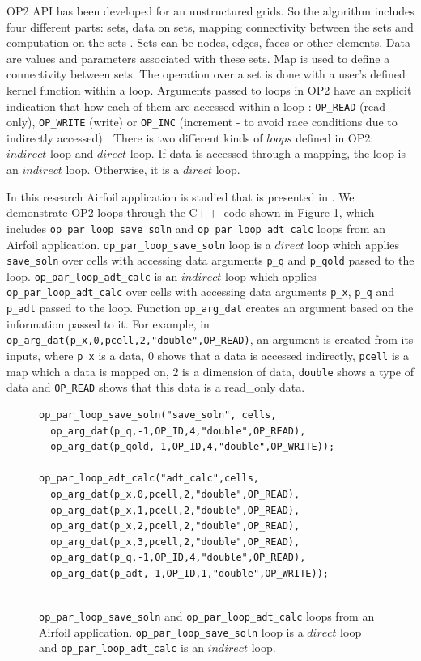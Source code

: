 \documentclass[conference]{IEEEtran}
\begin{document}
OP2 API has been developed for an unstructured grids. So the algorithm includes four different parts: sets, data on sets, mapping connectivity between the sets and computation on the sets \cite{o2,o7}. Sets can be nodes, edges, faces or other elements. Data are values and parameters associated with these sets. Map is used to define a connectivity between sets. The operation over a set is done with a user's defined kernel function within a loop. Arguments passed to loops in OP2 have an explicit indication that how each of them are accessed within a loop : \texttt{OP\_READ} (read only), \texttt{OP\_WRITE} (write) or \texttt{OP\_INC} (increment - to avoid race conditions due to indirectly accessed) \cite{o1}. There is two different kinds of $loops$ defined in OP2: $indirect$ loop and $direct$ loop. If data is accessed through a mapping, the loop is an $indirect$ loop. Otherwise, it is a $direct$ loop. 

In this research Airfoil application is studied that is presented in \cite{o8}. We demonstrate OP2 loops through the C$++$ code shown in Figure \ref{o1}, which includes \texttt{op\_par\_loop\_save\_soln} and \texttt{op\_par\_loop\_adt\_calc} loops from an Airfoil application. \texttt{op\_par\_loop\_save\_soln} loop is a $direct$ loop which applies \texttt{save\_soln} over cells with accessing data arguments \texttt{p\_q} and \texttt{p\_qold} passed to the loop. \texttt{op\_par\_loop\_adt\_calc} is an $indirect$ loop which applies \texttt{op\_par\_loop\_adt\_calc} over cells with accessing data arguments \texttt{p\_x}, \texttt{p\_q} and \texttt{p\_adt} passed to the loop. Function \texttt{op\_arg\_dat} creates an argument based on the information passed to it. For example, in \texttt{op\_arg\_dat(p\_x,0,pcell,2,"double",OP\_READ)}, an argument is created from its inputs, where \texttt{p\_x} is a data, $0$ shows that a data is accessed indirectly, \texttt{pcell} is a map which a data is mapped on, $2$ is a dimension of data, \texttt{double} shows a type of data and \texttt{OP\_READ} shows that this data is a read\_only data.

\begin{figure} 
    \begin{lstlisting}
op_par_loop_save_soln("save_soln", cells,
  op_arg_dat(p_q,-1,OP_ID,4,"double",OP_READ),
  op_arg_dat(p_qold,-1,OP_ID,4,"double",OP_WRITE));
  
op_par_loop_adt_calc("adt_calc",cells,
  op_arg_dat(p_x,0,pcell,2,"double",OP_READ),
  op_arg_dat(p_x,1,pcell,2,"double",OP_READ),
  op_arg_dat(p_x,2,pcell,2,"double",OP_READ),
  op_arg_dat(p_x,3,pcell,2,"double",OP_READ),
  op_arg_dat(p_q,-1,OP_ID,4,"double",OP_READ),
  op_arg_dat(p_adt,-1,OP_ID,1,"double",OP_WRITE));
  
    \end{lstlisting}
    \caption{\small{\texttt{op\_par\_loop\_save\_soln} and \texttt{op\_par\_loop\_adt\_calc} loops from an Airfoil application.  \texttt{op\_par\_loop\_save\_soln} loop is a $direct$ loop and \texttt{op\_par\_loop\_adt\_calc} is an $indirect$ loop.}}
    \label{o1}
\end{figure}
\end{document}

